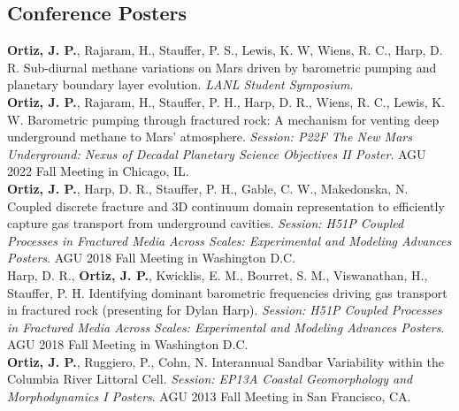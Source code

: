 \documentclass[11pt, letterpaper]{article}
\newcommand{\years}[1]{\marginnote{\scriptsize #1}}
\begin{document}
\subsection*{Conference Posters}
\years{2023}\textbf{Ortiz, J. P.}, Rajaram, H., Stauffer, P. S., Lewis, K. W,
Wiens, R. C., Harp, D. R. Sub-diurnal methane variations on Mars driven by
barometric pumping and planetary boundary layer evolution. \textit{LANL Student
Symposium}.\\
%
\years{2022}\textbf{Ortiz, J. P.}, Rajaram, H., Stauffer, P. H., Harp, D. R.,
Wiens, R. C., Lewis, K. W. Barometric pumping through fractured rock: A
mechanism for venting deep underground methane to Mars' atmosphere.
\textit{Session: P22F The New Mars Underground: Nexus of Decadal Planetary
Science Objectives II Poster}. AGU 2022 Fall Meeting in Chicago, IL.\\ 
%
\years{2018}\textbf{Ortiz, J. P.}, Harp, D. R., Stauffer, P. H., Gable, C. W.,
Makedonska, N. Coupled discrete fracture and 3D continuum domain representation
to efficiently capture gas transport from underground cavities.
\textit{Session: H51P Coupled Processes in Fractured Media Across Scales:
Experimental and Modeling Advances Posters}. AGU 2018 Fall Meeting in
Washington D.C.\\
%
\years{2018}Harp, D. R., \textbf{Ortiz, J. P.}, Kwicklis, E. M., Bourret, S.
M., Viswanathan, H., Stauffer, P. H. Identifying dominant barometric
frequencies driving gas transport in fractured rock 
(presenting for Dylan Harp). \textit{Session: H51P Coupled Processes in
Fractured Media Across Scales: Experimental and Modeling Advances Posters}. AGU
2018 Fall Meeting in Washington D.C.\\
%
\years{2013}\textbf{Ortiz, J. P.}, Ruggiero, P., Cohn, N. Interannual Sandbar
Variability within the Columbia River Littoral Cell.
\textit{Session: EP13A Coastal Geomorphology and Morphodynamics I Posters}.
AGU 2013 Fall Meeting in San Francisco, CA.
\end{document}
